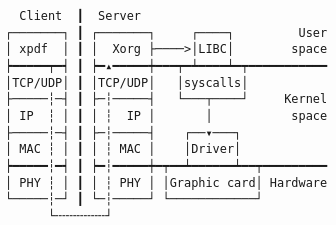 \documentclass[varwidth,crop]{standalone}
\begin{document}
\begin{verbatim}
  Client  ┃  Server
┌───────┐ ┃ ┌───────┐     ┌────┐         User
│ xpdf  │ ┃ │  Xorg ├────>│LIBC│        space
┝━━━━━┯━┥ ┃ ┝━▴━━━━━┿━━━┯━┷━━━━┷━┯━━━━━━━━━━━
│TCP/UDP│ ┃ │TCP/UDP│   │syscalls│
├─────┆─┤ ┃ ├─┆─────┤   └───┬────┘     Kernel
│ IP  ┆ │ ┃ │ ┆  IP │       │           space
├─────┆─┤ ┃ ├─┆─────┤    ┌──▾───┐
│ MAC ┆ │ ┃ │ ┆ MAC │    │Driver│
┝━━━━━┆━┥ ┃ ┝━┆━━━━━┿━┯━━┷━━━━━━┷━━┯━━━━━━━━━
│ PHY ┆ │ ┃ │ ┆ PHY │ │Graphic card│ Hardware
└─────┆─┘ ┃ └─┆─────┘ └────────────┘
      └╌╌╌╌╌╌╌┘ 
\end{verbatim}
\end{document}
